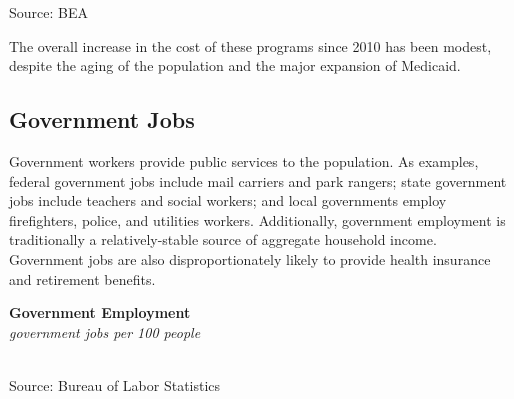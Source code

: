 \documentclass{report}
\makeatletter
\newcommand{\tbllink}[1]{\href{https://raw.githubusercontent.com/bdecon/US-chartbook/master/chartbook/data/#1}{\faTable}}
\newcommand*\short[1]{\expandafter\@gobbletwo\number\numexpr#1\relax}
\newcommand{\absnode}[3]{\node[below right, align=left] at (axis cs: #1,#2) {#3};}
\newcommand{\shdateaxisticks}{
		date coordinates in=x, axis line style={draw=none},
		xmax={2023-11-01},
		max space between ticks=40,	    
		xtick={{1990-01-01}, {1995-01-01}, {2000-01-01}, 
			{2005-01-01}, {2010-01-01}, {2015-01-01}, {2020-01-01}},
		minor xtick={},
		enlarge y limits={0.06}, enlarge x limits={0.01},
		}
\newcommand{\bbar}[2]{extra #1 ticks = {{#2}}, extra #1 tick labels = ,
		extra #1 tick style = {grid=major, grid style={thick, black!25}},}
\newcommand{\stdline}[4]{\addplot[very thick, no markers, color=#1] 
		table [x=#2, y=#3, col sep=comma] {#4};	}
\newcommand{\rbars}{
		\fill[color=black!10] (axis cs:{1990-07-01},\pgfkeysvalueof{/pgfplots/ymin}) rectangle 
			(axis cs:{1991-03-01}, \pgfkeysvalueof{/pgfplots/ymax});
		\fill[color=black!10] (axis cs:{2007-12-01},\pgfkeysvalueof{/pgfplots/ymin}) rectangle 
			(axis cs:{2009-07-01}, \pgfkeysvalueof{/pgfplots/ymax});
		\fill[color=black!10] (axis cs:{2001-03-01},\pgfkeysvalueof{/pgfplots/ymin}) rectangle 
			(axis cs:{2001-11-01}, \pgfkeysvalueof{/pgfplots/ymax});
		\fill[color=black!10] (axis cs:{2020-02-01},\pgfkeysvalueof{/pgfplots/ymin}) rectangle 
			(axis cs:{2020-05-01}, \pgfkeysvalueof{/pgfplots/ymax});}
\makeatother
\begin{document}
{\begin{minipage}{0.35\textwidth}
\footnotesize{Source: BEA} \hfill \tbllink{prog_exp.csv}
\end{minipage}
\vspace{1mm}

\begin{minipage}{0.76\textwidth}
\small The overall increase in the cost of these programs since 2010 has been modest, despite the aging of the population and the major expansion of Medicaid. 
\end{minipage} 
\newpage
\hypertarget{govjo}{\label{govjo}}
\begin{minipage}{0.76\textwidth}
\subsection*{Government Jobs}
 
\small Government workers provide public services to the population. As examples, federal government jobs include mail carriers and park rangers; state government jobs include teachers and social workers; and local governments employ firefighters, police, and utilities workers. Additionally, government employment is traditionally a relatively-stable source of aggregate household income. Government jobs are also disproportionately likely to provide health insurance and retirement benefits.  
\end{minipage}
\vspace{1mm}

\begin{minipage}{0.36\textwidth}
\normalsize \textbf{Government Employment}\\
\footnotesize{\textit{government jobs per 100 people}}\\
\hspace*{-2mm} \\
\footnotesize{Source: Bureau of Labor Statistics} \hfill \tbllink{govjobs.csv}
\end{minipage}\hspace{5mm}
\begin{minipage}{0.36\textwidth}
\small 
\end{minipage}
\newpage
\vspace*{-10mm}

}
\end{document}
